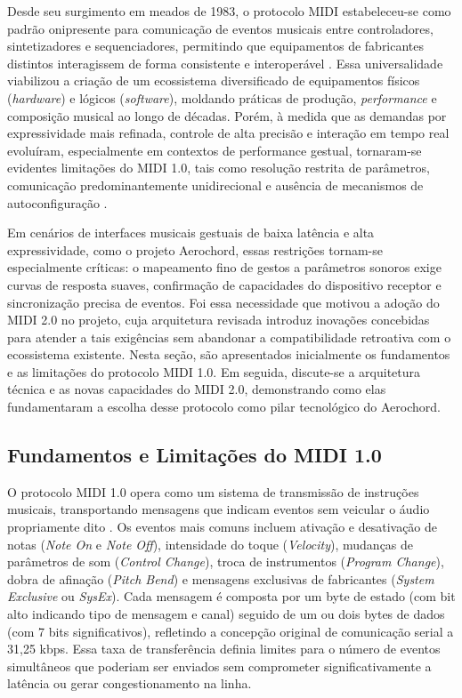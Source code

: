 Desde seu surgimento em meados de 1983, o protocolo MIDI estabeleceu-se como padrão onipresente para comunicação de eventos musicais entre controladores, sintetizadores e sequenciadores, permitindo que equipamentos de fabricantes distintos interagissem de forma consistente e interoperável \cite{SMC2023MIDI,MIDI1DetailedSpec}. Essa universalidade viabilizou a criação de um ecossistema diversificado de equipamentos físicos (\textit{hardware}) e lógicos (\textit{software}), moldando práticas de produção, \textit{performance} e composição musical ao longo de décadas. Porém, à medida que as demandas por expressividade mais refinada, controle de alta precisão e interação em tempo real evoluíram, especialmente em contextos de performance gestual, tornaram-se evidentes limitações do MIDI 1.0, tais como resolução restrita de parâmetros, comunicação predominantemente unidirecional e ausência de mecanismos de autoconfiguração \cite{MIDI2Overview2023}.

Em cenários de interfaces musicais gestuais de baixa latência e alta expressividade, como o projeto Aerochord, essas restrições tornam-se especialmente críticas: o mapeamento fino de gestos a parâmetros sonoros exige curvas de resposta suaves, confirmação de capacidades do dispositivo receptor e sincronização precisa de eventos. Foi essa necessidade que motivou a adoção do MIDI 2.0 no projeto, cuja arquitetura revisada introduz inovações concebidas para atender a tais exigências sem abandonar a compatibilidade retroativa com o ecossistema existente. Nesta seção, são apresentados inicialmente os fundamentos e as limitações do protocolo MIDI 1.0. Em seguida, discute-se a arquitetura técnica e as novas capacidades do MIDI 2.0, demonstrando como elas fundamentaram a escolha desse protocolo como pilar tecnológico do Aerochord.

\subsection{Fundamentos e Limitações do MIDI 1.0}
O protocolo MIDI 1.0 opera como um sistema de transmissão de instruções musicais, transportando mensagens que indicam eventos sem veicular o áudio propriamente dito \cite{SMC2023MIDI,MIDI1DetailedSpec}. Os eventos mais comuns incluem ativação e desativação de notas (\textit{Note On} e \textit{Note Off}), intensidade do toque (\textit{Velocity}), mudanças de parâmetros de som (\textit{Control Change}), troca de instrumentos (\textit{Program Change}), dobra de afinação (\textit{Pitch Bend}) e mensagens exclusivas de fabricantes (\textit{System Exclusive} ou \textit{SysEx}). Cada mensagem é composta por um byte de estado (com bit alto indicando tipo de mensagem e canal) seguido de um ou dois bytes de dados (com 7 bits significativos), refletindo a concepção original de comunicação serial a 31,25 kbps. Essa taxa de transferência definia limites para o número de eventos simultâneos que poderiam ser enviados sem comprometer significativamente a latência ou gerar congestionamento na linha.

